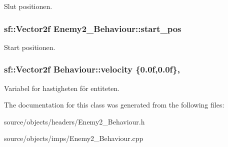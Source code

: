 Slut positionen. 

\hypertarget{classEnemy2__Behaviour_a8adc028fa38366e2e7d204f7da84e34c}{
\subsubsection[{start\+\_\+pos}]{\setlength{\rightskip}{0pt plus 5cm}sf\+::\+Vector2f Enemy2\+\_\+\+Behaviour\+::start\+\_\+pos\hspace{0.3cm}{\ttfamily [private]}}}\label{classEnemy2__Behaviour_a8adc028fa38366e2e7d204f7da84e34c}


Start positionen. 

\hypertarget{classBehaviour_a1d52096cf20a59890f7705acbaccf88a}{
\subsubsection[{velocity}]{\setlength{\rightskip}{0pt plus 5cm}sf\+::\+Vector2f Behaviour\+::velocity \{0.\+0f,0.\+0f\}\hspace{0.3cm}{\ttfamily [protected]}, {\ttfamily [inherited]}}}\label{classBehaviour_a1d52096cf20a59890f7705acbaccf88a}


Variabel for hastigheten för entiteten. 



The documentation for this class was generated from the following files\+:\begin{DoxyCompactItemize}
\item 
source/objects/headers/Enemy2\+\_\+\+Behaviour.\+h\item 
source/objects/imps/Enemy2\+\_\+\+Behaviour.\+cpp\end{DoxyCompactItemize}
